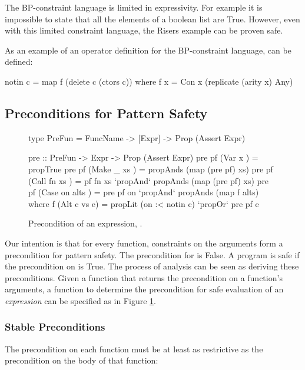 The BP-constraint language is limited in expressivity. For example it is impossible to state that all the elements of a boolean list are True. However, even with this limited constraint language, the Risers example can be proven safe.

As an example of an operator definition for the BP-constraint language,  can be defined:

\begin{code}
notin c = map f (delete c (ctors c))
   where f x = Con x (replicate (arity x) Any)
\end{code}


\subsection{Preconditions for Pattern Safety}
\label{sec:precond}

\begin{figure}
\begin{code}
type PreFun = FuncName -> [Expr] -> Prop (Assert Expr)

pre :: PreFun -> Expr -> Prop (Assert Expr)
pre pf (Var   x         ) = propTrue
pre pf (Make  _   xs    ) = propAnds (map (pre pf) xs)
pre pf (Call  fn  xs    ) = pf fn xs `propAnd` propAnds (map (pre pf) xs)
pre pf (Case  on  alts  ) = pre pf on `propAnd` propAnds (map f alts)
    where f (Alt c vs e) = propLit (on :< notin c) `propOr` pre pf e
\end{code}
\caption{Precondition of an expression, .}
\label{fig:precondition}
\figureend
\end{figure}

Our intention is that for every function, constraints on the arguments form a precondition for pattern safety. The precondition for  is False. A program is safe if the precondition on  is True. The process of analysis can be seen as deriving these preconditions. Given a function  that returns the precondition on a function's arguments, a function to determine the precondition for safe evaluation of an \textit{expression} can be specified as  in Figure \ref{fig:precondition}.

\subsubsection{Stable Preconditions}
\label{sec:fixp_precond}

The precondition on each function must be at least as restrictive as the precondition on the body of that function:

